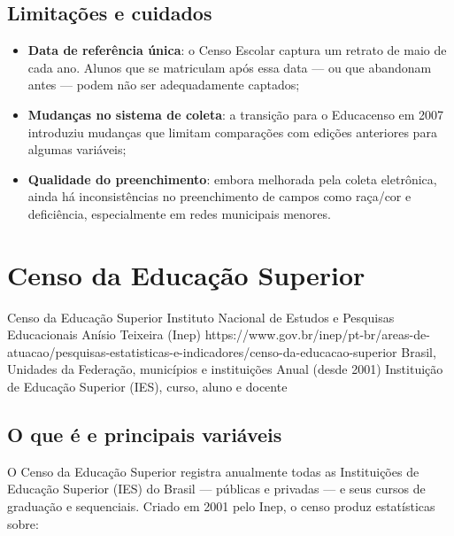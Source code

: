 \subsection{Limitações e cuidados}

\begin{itemize}
  \item \textbf{Data de referência única}: o Censo Escolar captura um retrato de maio de cada ano. Alunos que se matriculam após essa data — ou que abandonam antes — podem não ser adequadamente captados;
  \item \textbf{Mudanças no sistema de coleta}: a transição para o Educacenso em 2007 introduziu mudanças que limitam comparações com edições anteriores para algumas variáveis;
  \item \textbf{Qualidade do preenchimento}: embora melhorada pela coleta eletrônica, ainda há inconsistências no preenchimento de campos como raça/cor e deficiência, especialmente em redes municipais menores.
\end{itemize}

\section{Censo da Educação Superior}

\ficharapida
  {Censo da Educação Superior}
  {Instituto Nacional de Estudos e Pesquisas Educacionais Anísio Teixeira (Inep)}
  {https://www.gov.br/inep/pt-br/areas-de-atuacao/pesquisas-estatisticas-e-indicadores/censo-da-educacao-superior}
  {Brasil, Unidades da Federação, municípios e instituições}
  {Anual (desde 2001)}
  {Instituição de Educação Superior (IES), curso, aluno e docente}

\subsection{O que é e principais variáveis}

O Censo da Educação Superior registra anualmente todas as Instituições de Educação Superior (IES) do Brasil — públicas e privadas — e seus cursos de graduação e sequenciais. Criado em 2001 pelo Inep, o censo produz estatísticas sobre:

